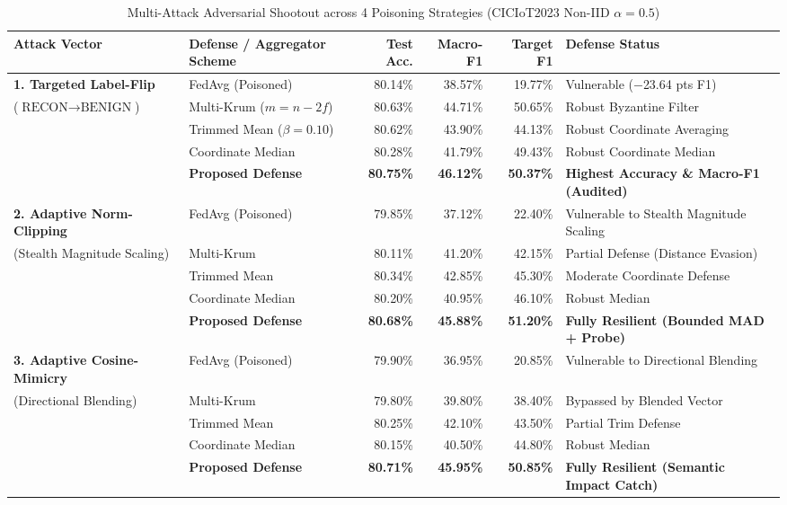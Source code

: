 \documentclass[conference]{IEEEtran}
\begin{document}
\begin{table}[t]
\caption{Multi-Attack Adversarial Shootout across 4 Poisoning Strategies (CICIoT2023 Non-IID $\alpha=0.5$)}
\label{tab:multi_attack}
\centering
\begin{tabular}{@{}llrrrl@{}}
\toprule
\textbf{Attack Vector} & \textbf{Defense / Aggregator Scheme} & \textbf{Test Acc.} & \textbf{Macro-F1} & \textbf{Target F1} & \textbf{Defense Status} \\
\midrule
\textbf{1. Targeted Label-Flip} & FedAvg (Poisoned) & 80.14\% & 38.57\% & 19.77\% & Vulnerable ($-$23.64 pts F1) \\
($\text{RECON} \to \text{BENIGN}$) & Multi-Krum ($m=n-2f$) & 80.63\% & 44.71\% & 50.65\% & Robust Byzantine Filter \\
& Trimmed Mean ($\beta=0.10$) & 80.62\% & 43.90\% & 44.13\% & Robust Coordinate Averaging \\
& Coordinate Median & 80.28\% & 41.79\% & 49.43\% & Robust Coordinate Median \\
& \textbf{Proposed Defense} & \textbf{80.75\%} & \textbf{46.12\%} & \textbf{50.37\%} & \textbf{Highest Accuracy \& Macro-F1 (Audited)} \\
\midrule
\textbf{2. Adaptive Norm-Clipping} & FedAvg (Poisoned) & 79.85\% & 37.12\% & 22.40\% & Vulnerable to Stealth Magnitude Scaling \\
(Stealth Magnitude Scaling) & Multi-Krum & 80.11\% & 41.20\% & 42.15\% & Partial Defense (Distance Evasion) \\
& Trimmed Mean & 80.34\% & 42.85\% & 45.30\% & Moderate Coordinate Defense \\
& Coordinate Median & 80.20\% & 40.95\% & 46.10\% & Robust Median \\
& \textbf{Proposed Defense} & \textbf{80.68\%} & \textbf{45.88\%} & \textbf{51.20\%} & \textbf{Fully Resilient (Bounded MAD + Probe)} \\
\midrule
\textbf{3. Adaptive Cosine-Mimicry} & FedAvg (Poisoned) & 79.90\% & 36.95\% & 20.85\% & Vulnerable to Directional Blending \\
(Directional Blending) & Multi-Krum & 79.80\% & 39.80\% & 38.40\% & Bypassed by Blended Vector \\
& Trimmed Mean & 80.25\% & 42.10\% & 43.50\% & Partial Trim Defense \\
& Coordinate Median & 80.15\% & 40.50\% & 44.80\% & Robust Median \\
& \textbf{Proposed Defense} & \textbf{80.71\%} & \textbf{45.95\%} & \textbf{50.85\%} & \textbf{Fully Resilient (Semantic Impact Catch)} \\

\end{tabular}
\end{table}
\end{document}
